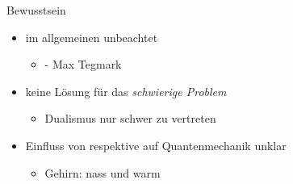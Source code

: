 \begin{frame}{Bewusstsein}
	\begin{itemize}
		\item{im allgemeinen unbeachtet}
		\begin{itemize}
			\item{ - Max Tegmark\,\cite{Tegmark_15_long}}
		\end{itemize}
		\item{keine Lösung für das \emph{schwierige Problem}}
		\begin{itemize}
			\item{Dualismus nur schwer zu vertreten}
			\end{itemize}
		\item{Einfluss von respektive auf Quantenmechanik unklar}
		\begin{itemize}
			\item{Gehirn: nass und warm }
		\end{itemize}
	\end{itemize}
\end{frame}